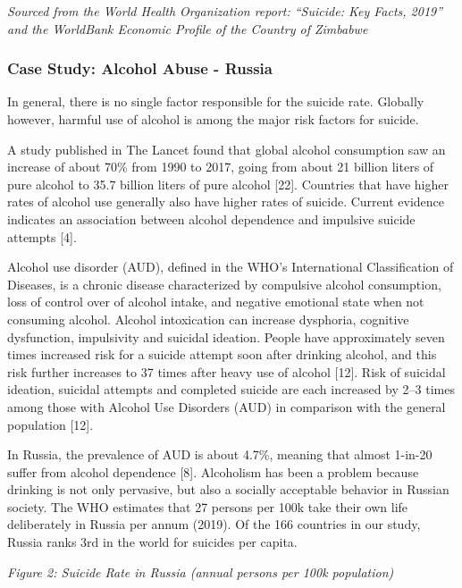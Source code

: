 \documentclass[]{article}
\begin{document}
\emph{Sourced from the World Health Organization report: ``Suicide: Key
Facts, 2019'' and the WorldBank Economic Profile of the Country of
Zimbabwe}

\subsubsection{Case Study: Alcohol Abuse -
Russia}\label{case-study-alcohol-abuse---russia}

In general, there is no single factor responsible for the suicide rate.
Globally however, harmful use of alcohol is among the major risk factors
for suicide.

A study published in The Lancet found that global alcohol consumption
saw an increase of about 70\% from 1990 to 2017, going from about 21
billion liters of pure alcohol to 35.7 billion liters of pure alcohol
{[}22{]}. Countries that have higher rates of alcohol use generally also
have higher rates of suicide. Current evidence indicates an association
between alcohol dependence and impulsive suicide attempts {[}4{]}.

Alcohol use disorder (AUD), defined in the WHO's International
Classification of Diseases, is a chronic disease characterized by
compulsive alcohol consumption, loss of control over of alcohol intake,
and negative emotional state when not consuming alcohol. Alcohol
intoxication can increase dysphoria, cognitive dysfunction, impulsivity
and suicidal ideation. People have approximately seven times increased
risk for a suicide attempt soon after drinking alcohol, and this risk
further increases to 37 times after heavy use of alcohol {[}12{]}. Risk
of suicidal ideation, suicidal attempts and completed suicide are each
increased by 2--3 times among those with Alcohol Use Disorders (AUD) in
comparison with the general population {[}12{]}.

In Russia, the prevalence of AUD is about 4.7\%, meaning that almost
1-in-20 suffer from alcohol dependence {[}8{]}. Alcoholism has been a
problem because drinking is not only pervasive, but also a socially
acceptable behavior in Russian society. The WHO estimates that 27
persons per 100k take their own life deliberately in Russia per annum
(2019). Of the 166 countries in our study, Russia ranks 3rd in the world
for suicides per capita.

\emph{Figure 2: Suicide Rate in Russia (annual persons per 100k
population)}
\end{document}
